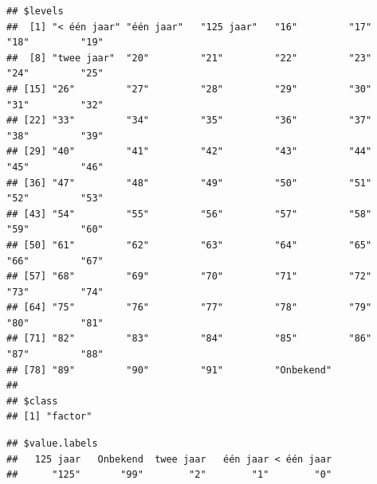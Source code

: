 \documentclass[
]{book}
\newenvironment{Shaded}{\begin{snugshade}}{\end{snugshade}}
\newcommand{\CommentTok}[1]{\textcolor[rgb]{0.56,0.35,0.01}{\textit{#1}}}
\newcommand{\KeywordTok}[1]{\textcolor[rgb]{0.13,0.29,0.53}{\textbf{#1}}}
\newcommand{\NormalTok}[1]{#1}
\newcommand{\OperatorTok}[1]{\textcolor[rgb]{0.81,0.36,0.00}{\textbf{#1}}}
\begin{document}
\begin{Shaded}
\end{Shaded}

\begin{verbatim}
## $levels
##  [1] "< één jaar" "één jaar"   "125 jaar"   "16"         "17"         "18"         "19"        
##  [8] "twee jaar"  "20"         "21"         "22"         "23"         "24"         "25"        
## [15] "26"         "27"         "28"         "29"         "30"         "31"         "32"        
## [22] "33"         "34"         "35"         "36"         "37"         "38"         "39"        
## [29] "40"         "41"         "42"         "43"         "44"         "45"         "46"        
## [36] "47"         "48"         "49"         "50"         "51"         "52"         "53"        
## [43] "54"         "55"         "56"         "57"         "58"         "59"         "60"        
## [50] "61"         "62"         "63"         "64"         "65"         "66"         "67"        
## [57] "68"         "69"         "70"         "71"         "72"         "73"         "74"        
## [64] "75"         "76"         "77"         "78"         "79"         "80"         "81"        
## [71] "82"         "83"         "84"         "85"         "86"         "87"         "88"        
## [78] "89"         "90"         "91"         "Onbekend"  
## 
## $class
## [1] "factor"
\end{verbatim}

\begin{Shaded}
\end{Shaded}

\begin{verbatim}
## $value.labels
##   125 jaar   Onbekend  twee jaar   één jaar < één jaar 
##      "125"       "99"        "2"        "1"        "0"
\end{verbatim}

\begin{Shaded}
\end{Shaded}
\end{document}
